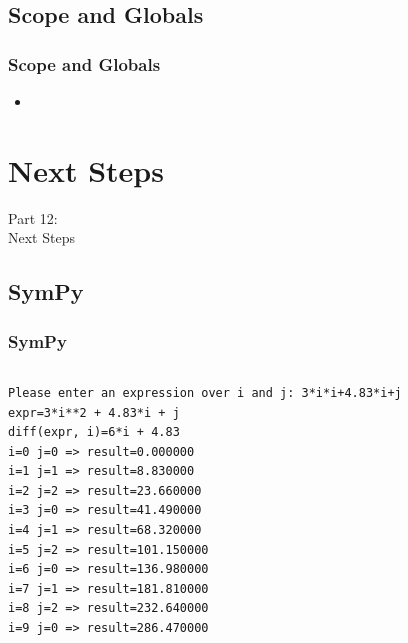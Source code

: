 \subsection{Scope and Globals}
\begin{frame}
    \frametitle{Scope and Globals}
    \vspace{5mm}
    
    \begin{itemize}
      \item 
    \end{itemize}
\end{frame}


\section{Next Steps}
\begin{frame}
    \vspace{25mm}
    \begin{center}
        \Huge{Part 12:\\Next Steps}
    \end{center}
\end{frame}

\subsection{SymPy}
\begin{frame}[fragile]
    \frametitle{SymPy}
    \vspace{2mm}
    \inputminted[fontsize=\tiny]{python}{../src/sympyexample.py}
    \pause
    \vspace{5mm}
    
    {\tiny
    \begin{verbatim}
Please enter an expression over i and j: 3*i*i+4.83*i+j 
expr=3*i**2 + 4.83*i + j
diff(expr, i)=6*i + 4.83
i=0 j=0 => result=0.000000
i=1 j=1 => result=8.830000
i=2 j=2 => result=23.660000
i=3 j=0 => result=41.490000
i=4 j=1 => result=68.320000
i=5 j=2 => result=101.150000
i=6 j=0 => result=136.980000
i=7 j=1 => result=181.810000
i=8 j=2 => result=232.640000
i=9 j=0 => result=286.470000
    \end{verbatim}
    }
\end{frame}

